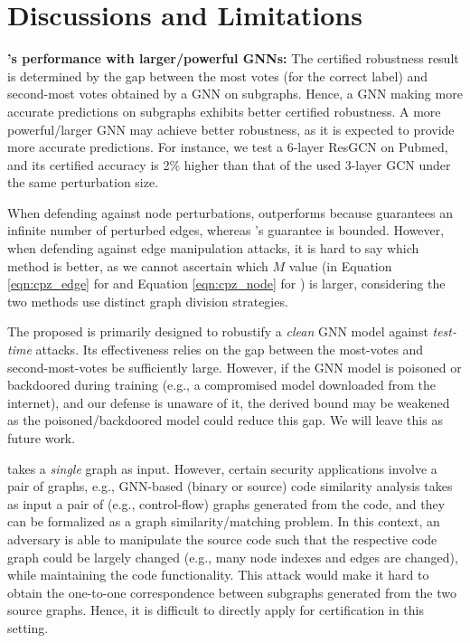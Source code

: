 \section{Discussions and Limitations}
\label{sec:discussion}

{\bf {\name}'s performance with larger/powerful GNNs:}
The certified robustness result is determined by the gap between the most votes (for the correct label) and second-most votes obtained by a GNN on subgraphs.
Hence, a GNN making more accurate predictions on subgraphs exhibits better certified robustness. A more powerful/larger GNN may achieve better robustness, as it is expected to provide more accurate predictions. For instance, we test a 6-layer ResGCN \cite{li2019deepgcns} on Pubmed, and its certified accuracy is 2\% higher than that of the used 3-layer GCN under the same perturbation size. 


\vspace{+0.05in}
 When defending against 
node perturbations, {\nameN} outperforms {\nameE} because {\nameN}  guarantees an infinite number of perturbed edges, whereas {\nameE}'s guarantee is bounded. 
However, when defending against edge manipulation attacks, it is hard to say which method is better, as we cannot ascertain which $M$ value (in Equation \ref{eqn:cpz_edge} for {\nameE} and Equation \ref{eqn:cpz_node} for {\nameN}) is larger, considering the two methods use distinct graph division strategies.


\vspace{+0.05in}
The proposed {\name} is primarily designed to robustify a \emph{clean} GNN model against \emph{test-time} attacks. Its effectiveness relies on the gap between the most-votes and second-most-votes be sufficiently large. However, if the GNN model is poisoned \cite{wang2023turning} or backdoored \cite{zhang2021backdoor,xi2021graph,yang2024distributed} during training (e.g., a compromised model downloaded from the internet), and our defense is unaware of it, the derived bound may be weakened as the poisoned/backdoored model could reduce this gap. We will leave this as future work.


\vspace{+0.05in}
{\name} takes a \emph{single} graph as input. 
However, certain security applications involve a pair of graphs, e.g., GNN-based (binary or source) code similarity analysis \cite{he2022illuminati,li2019graph,liu2023learning,kim2022revisiting,gao2024sigmadiff,marcelli2022machine} takes as input a pair of  (e.g., control-flow) graphs generated from the code, and they can be formalized as a graph similarity/matching problem. In this context, an adversary is able to manipulate the source code such that the respective code graph could be largely changed (e.g., many node indexes and edges are changed), while maintaining the code functionality. This attack would make it hard to obtain the one-to-one correspondence between subgraphs generated from the two source graphs. 
Hence, it is difficult to directly apply {\name} for certification in this setting. 


